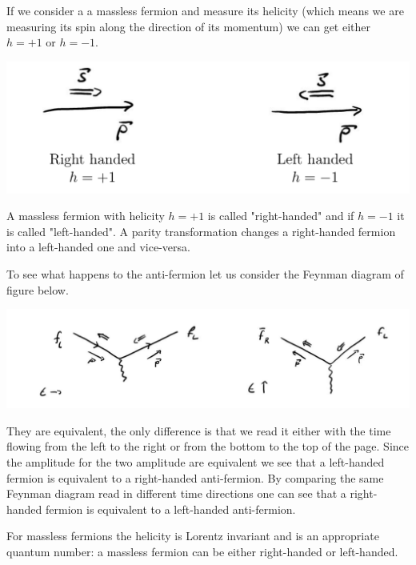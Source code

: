 \documentclass[12pt]{article}
\begin{document}
If we consider a a massless fermion and measure its helicity (which means we are measuring its spin along the direction of its momentum) we can get either $h=+1$ or $h=-1$. 
\begin{center}
\includegraphics[scale=0.2]{images/LRhanded.png}
\end{center}
A massless fermion with helicity $h=+1$ is called "right-handed"  and if $h=-1$ it is called "left-handed". A parity transformation changes a right-handed fermion into a left-handed one and vice-versa. 

To see what happens to the anti-fermion let us consider the Feynman diagram of figure below. 
\begin{center}
\includegraphics[scale=0.2]{images/LRfermionAntifermion.png}
\end{center}

They are equivalent, the only difference is that we read it either with the time flowing from the left to the right or from the bottom to the top of the page. Since the amplitude for the two amplitude are equivalent we see that a left-handed fermion is equivalent to a right-handed anti-fermion. By comparing the same Feynman diagram read in different time directions one can see that a right-handed fermion is equivalent to a left-handed anti-fermion.

For massless fermions the helicity is Lorentz invariant and is an appropriate quantum number: a massless fermion can be either right-handed or left-handed.
\end{document}
